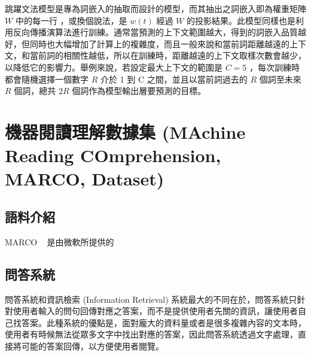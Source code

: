 跳躍文法模型是專為詞嵌入的抽取而設計的模型，而其抽出之詞嵌入即為權重矩陣 $W$ 中的每一行%
，或換個說法，是 $w(t)$ 經過 $W$ 的投影結果。此模型同樣也是利用反向傳播演算法進行訓練。通常當預測的上下文範圍越大，得到的詞嵌入品質越好，但同時也大幅增加了計算上的複雜度，而且一般來說和當前詞距離越遠的上下文，和當前詞的相關性越低，所以在訓練時，距離越遠的上下文取樣次數會越少，以降低它的影響力。舉例來說，若設定最大上下文的範圍是 $C=5$ ，每次訓練時都會隨機選擇一個數字 $R$ 介於 1 到 C 之間，並且以當前詞過去的 $R$ 個詞至未來 $R$ 個詞，總共 $2R$ 個詞作為模型輸出層要預測的目標。

\section{機器閱讀理解數據集 (MAchine Reading COmprehension, MARCO, Dataset)}
\subsection{語料介紹}
MARCO ~\cite{nguyen2016ms} 是由微軟所提供的
\subsection{問答系統}
問答系統和資訊檢索 (Information Retrieval) 系統最大的不同在於，問答系統只針對使用者輸入的問句回傳對應之答案，而不是提供使用者先關的資訊，讓使用者自己找答案。此種系統的優點是，面對龐大的資料量或者是很多複雜內容的文本時，使用者有時候無法從眾多文字中找出對應的答案，因此問答系統透過文字處理，直接將可能的答案回傳，以方便使用者閱覽。
